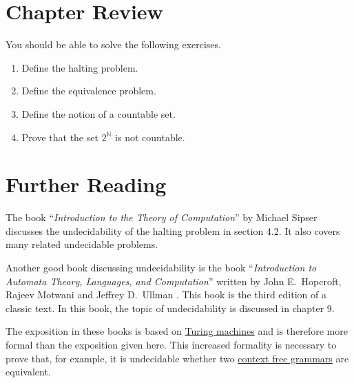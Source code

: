 \section{Chapter Review}
You should be able to solve the following exercises.
\begin{enumerate}
\item Define the halting problem.
\item Define the equivalence problem.
\item Define the notion of a countable set.
\item Prove that the set $2^{\mathbb{N}}$ is not countable.
\end{enumerate}


\section{Further Reading}
The book ``\emph{Introduction to the Theory of Computation}'' by Michael Sipser \cite{sipser:1996}
discusses the undecidability of the halting problem in section 4.2.  It also covers many related
undecidable problems.

Another good book discussing undecidability is the book 
``\emph{Introduction to Automata Theory, Languages, and Computation}'' written by John E.~Hopcroft,
Rajeev Motwani and Jeffrey D.~Ullman \cite{hopcroft:06}.  This book is the third edition of a
classic text.  In this book, the topic of undecidability is discussed in chapter 9.

The exposition in these books is based on
\href{https://en.wikipedia.org/wiki/Turing_machine}{Turing machines} and is therefore more formal than the
exposition given here.  This increased formality is necessary to prove that, for example, it is undecidable
whether two \href{https://en.wikipedia.org/wiki/Context-free_grammar}{context free grammars} are equivalent.



